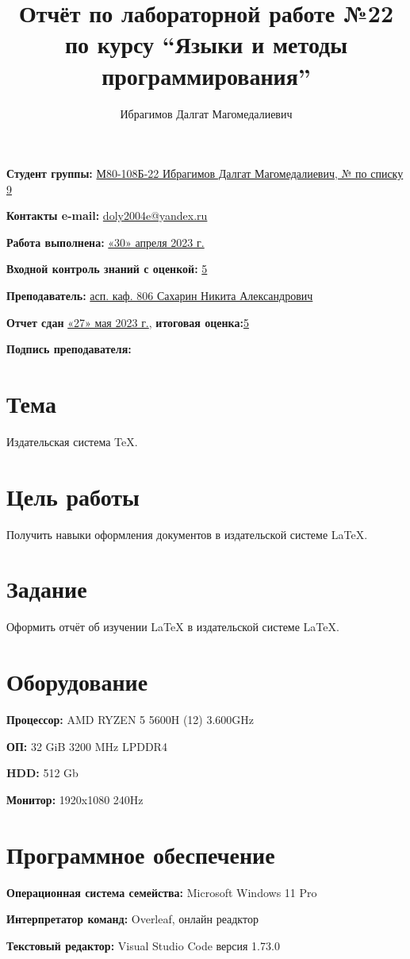 \documentclass[12pt, letterpaper]{article}
\title{Отчёт по лабораторной работе №22 по курсу “Языки и методы программирования”}
\author{Ибрагимов Далгат Магомедалиевич}
\begin{document}
\maketitle
\begin{description}
\item\textbf{Студент группы:} \underline{М80-108Б-22 Ибрагимов Далгат Магомедалиевич, № по списку 9}    
\item\textbf{Контакты e-mail:} \underline{doly2004e@yandex.ru}
\item\textbf{Работа выполнена:} \underline{«30» апреля 2023 г.}
\item\textbf{Входной контроль знаний с оценкой:} \underline{5}
\item\textbf{Преподаватель:} \underline{асп. каф. 806 Сахарин Никита Александрович}
\item\textbf{Отчет сдан} \underline{«27» мая 2023 г.}, \textbf{итоговая оценка:}\underline{5}
\item\textbf{Подпись преподавателя:} \underline{\hspace{3cm}}
\end{description}
\newpage
\section{Тема}
Издательская система \TeX{}.
\section{Цель работы}
Получить навыки оформления документов в издательской системе \LaTeX{}.
\section{Задание}
Оформить отчёт об изучении \LaTeX{} в издательской системе \LaTeX{}.
\section{Оборудование}
\begin{description}
\item\textbf{Процессор:} AMD RYZEN 5 5600H (12) 3.600GHz
\item\textbf{ОП:} 32 GiB 3200 MHz LPDDR4
\item\textbf{HDD:} 512 Gb
\item\textbf{Монитор:} 1920x1080 240Hz
\end{description}
\section{Программное обеспечение}
\begin{description}
\item\textbf{Операционная система семейства:} Microsoft Windows 11 Pro
\item\textbf{Интерпретатор команд:} Overleaf, онлайн реадктор
\item\textbf{Текстовый редактор:} Visual Studio Code версия 1.73.0
\end{description}
\end{document}
